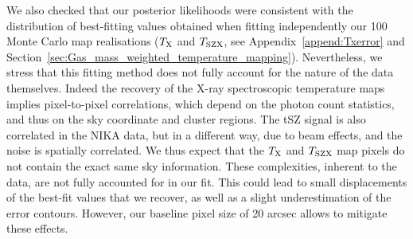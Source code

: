 \documentclass[twocolumn,traditabstract]{aa}
\def\TSZ {T_{\rm SZX}}
\def \TX {T_{\rm X}}
\begin{document}
We also checked that our posterior likelihoods were consistent with the distribution of best-fitting values obtained when fitting independently our 100 Monte Carlo map realisations ($\TX$ and $\TSZ$, see Appendix~\ref{append:Txerror} and Section~\ref{sec:Gas_mass_weighted_temperature_mapping}). Nevertheless, we stress that this fitting method does not fully account for the nature of the data themselves. Indeed the recovery of the X-ray spectroscopic temperature maps implies pixel-to-pixel correlations, which depend on the photon count statistics, and thus on the sky coordinate and cluster regions. The tSZ signal is also correlated in the NIKA data, but in a different way, due to beam effects, and the noise is spatially correlated. We thus expect that the $\TX$ and $\TSZ$ map pixels do not contain the exact same sky information. These complexities, inherent to the data, are not fully accounted for in our fit. This could lead to small displacements of the best-fit values that we recover, as well as a slight underestimation of the error contours. However, our baseline pixel size of 20 arcsec allows to mitigate these effects.
\end{document}
